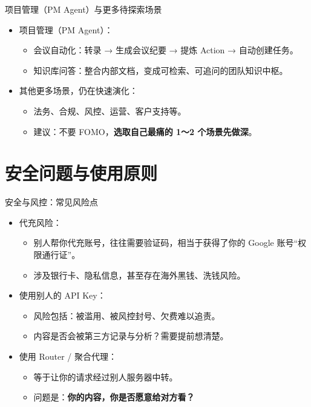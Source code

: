 \documentclass[10pt,aspectratio=169]{beamer}
\begin{document}
\begin{frame}{项目管理（PM Agent）与更多待探索场景}
  \begin{itemize}
    \item 项目管理（PM Agent）：
      \begin{itemize}
        \item 会议自动化：转录 → 生成会议纪要 → 提炼 Action → 自动创建任务。
        \item 知识库问答：整合内部文档，变成可检索、可追问的团队知识中枢。
      \end{itemize}
    \item 其他更多场景，仍在快速演化：
      \begin{itemize}
        \item 法务、合规、风控、运营、客户支持等。
        \item 建议：不要 FOMO，\textbf{选取自己最痛的 1～2 个场景先做深}。
      \end{itemize}
  \end{itemize}
\end{frame}

\section{安全问题与使用原则}

\begin{frame}{安全与风控：常见风险点}
  \begin{itemize}
    \item 代充风险：
      \begin{itemize}
        \item 别人帮你代充账号，往往需要验证码，相当于获得了你的 Google 账号“权限通行证”。
        \item 涉及银行卡、隐私信息，甚至存在海外黑钱、洗钱风险。
      \end{itemize}
    \item 使用别人的 API Key：
      \begin{itemize}
        \item 风险包括：被滥用、被风控封号、欠费难以追责。
        \item 内容是否会被第三方记录与分析？需要提前想清楚。
      \end{itemize}
    \item 使用 Router / 聚合代理：
      \begin{itemize}
        \item 等于让你的请求经过别人服务器中转。
        \item 问题是：\textbf{你的内容，你是否愿意给对方看？}
      \end{itemize}
  \end{itemize}
\end{frame}
\end{document}
